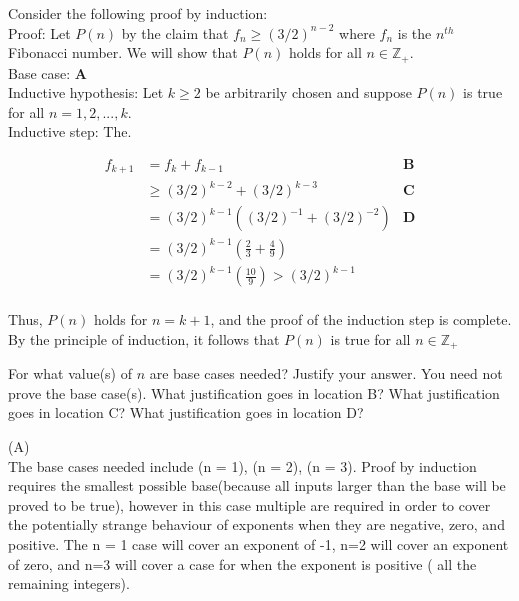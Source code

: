 \documentclass[solution,letterpaper]{cs20}
\begin{document}
    \begin{problem}

        Consider the following proof by induction: \\

        Proof: Let $P(n)$ by the claim that $f_n \geq (3/2)^{n-2}$ where $f_n$ is the $n^{th}$ Fibonacci number. We will show that $P(n)$ holds for all $n \in \mathbb{Z}_+$. \\

        Base case: \textbf{A} \\

        Inductive hypothesis: Let $k \geq 2$ be arbitrarily chosen and suppose $P(n)$ is true for all $n = 1, 2, . . . , k$. \\

        Inductive step: The.

        \begin{align*}
            f_{k+1} &= f_k + f_{k-1} & \textbf{B} \\
            &\geq (3/2)^{k-2} + (3/2)^{k-3} & \textbf{C} \\
            &= (3/2)^{k-1}((3/2)^{-1} + (3/2)^{-2}) & \textbf{D} \\
            &= (3/2)^{k-1}(\frac{2}{3}+\frac{4}{9}) & \\
            &= (3/2)^{k-1}(\frac{10}{9}) > (3/2)^{k-1} \\
        \end{align*}

        Thus, $P(n)$ holds for $n = k + 1$, and the proof of the induction step is complete.
        By the principle of induction, it follows that $P(n)$ is true for all $n \in \mathbb{Z}_+$

        \subproblem For what value(s) of $n$ are base cases needed? Justify your answer. You need not prove the base case(s).
        \subproblem What justification goes in location B?
        \subproblem What justification goes in location C?
        \subproblem What justification goes in location D?

        \begin{solution}
        (A) \\
        The base cases needed include (n = 1), (n = 2), (n = 3). Proof by induction requires the smallest possible base(because all inputs larger than the base will be proved to be true), however in this case multiple are required in order to cover the potentially strange behaviour of exponents when they are negative, zero, and positive. The n = 1 case will cover an exponent of -1, n=2 will cover an exponent of zero, and n=3 will cover a case for when the exponent is positive ( all the remaining integers). \\


\end{solution}
\end{problem}
\end{document}
